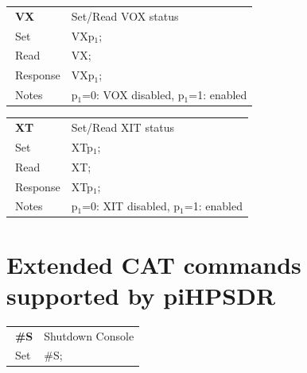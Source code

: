 \documentclass[12pt]{book}
\def\pH{pi\-HPSDR\xspace}
\begin{document}
\begin{center}
\begin{tabular}{|p{2cm}|p{11cm}|}
\toprule
$\phantom{\Big|}$\textbf{\large VX} & Set/Read VOX status \\\cline{1-2}
$\phantom{\Big|}${\large Set} & {VXp$_1$;} \\\hline
$\phantom{\Big|}${\large Read} & {VX;} \\\hline
$\phantom{\Big|}${\large Response} & {VXp$_1$;} \\\hline
$\phantom{\Big|}${\large Notes} & \multicolumn{1}{|p{11cm}|}{p$_1$=0: VOX disabled, p$_1$=1: enabled} \\
\bottomrule
\end{tabular}
\end{center}

\begin{center}
\begin{tabular}{|p{2cm}|p{11cm}|}
\toprule
$\phantom{\Big|}$\textbf{\large XT} & Set/Read XIT status \\\cline{1-2}
$\phantom{\Big|}${\large Set} & {XTp$_1$;} \\\hline
$\phantom{\Big|}${\large Read} & {XT;} \\\hline
$\phantom{\Big|}${\large Response} & {XTp$_1$;} \\\hline
$\phantom{\Big|}${\large Notes} & \multicolumn{1}{|p{11cm}|}{p$_1$=0: XIT disabled, p$_1$=1: enabled} \\
\bottomrule
\end{tabular}
\end{center}



\section[Extended CAT commands]{Extended CAT commands supported by \pH}

\begin{center}
\begin{tabular}{|p{2cm}|p{11cm}|}
\toprule
$\phantom{\Big|}$\textbf{\large \#S} & Shutdown Console \\\cline{1-2}
$\phantom{\Big|}${\large Set} & {\#S;} \\\hline
\bottomrule
\end{tabular}
\end{center}
\end{document}
